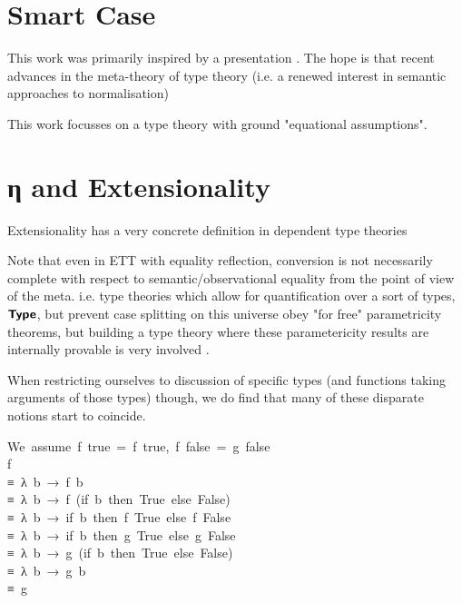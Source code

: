 \documentclass[
    a4paper, %
    fontsize=9.5pt, %
    twoside=false, %
	numbers=noenddot, %
	fontmethod=tex, %
]{kaobook}
\def\resethooks{%
  \global\let\SaveRestoreHook\empty
  \global\let\ColumnHook\empty}
\newlength{\blanklineskip}
\let\hspre\empty
\let\hspost\empty
\newcommand\Keyword[1]{\textsf{\textbf{#1}}}
\begin{document}
\section{Smart Case}

This work was primarily inspired by a presentation 
. The hope is that 
recent advances in the meta-theory of type theory (i.e. a renewed interest in 
semantic approaches to normalisation)

This work focusses on a type theory with ground "equational assumptions".

\section{η and Extensionality}

Extensionality has a very concrete definition in dependent type theories


Note that even in ETT with equality reflection, conversion is not necessarily
complete with respect to semantic/observational equality from the point of view
of the meta. i.e. type theories which allow for
quantification over a sort of types, \ensuremath{\Keyword{Type}}, but prevent case splitting
on this universe obey "for free" parametricity theorems, but building a type
theory where these parametericity results are internally provable is very 
involved .

When restricting ourselves to discussion of specific types (and functions taking
arguments of those types) though, we do find that many of these disparate
notions start to coincide.

\begin{hscode}\SaveRestoreHook
\column{B}{@{}>{\hspre}l<{\hspost}@{}}%
\column{E}{@{}>{\hspre}l<{\hspost}@{}}%
\>[B]{}\mbox{\onelinecomment  We assume f true = f true, f false = g false}{}\<[E]%
\\[\blanklineskip]%
\>[B]{}\mbox{\onelinecomment  f}{}\<[E]%
\\
\>[B]{}\mbox{\onelinecomment  ≡ λ b → f b}{}\<[E]%
\\
\>[B]{}\mbox{\onelinecomment  ≡ λ b → f (if b then True else False)}{}\<[E]%
\\
\>[B]{}\mbox{\onelinecomment  ≡ λ b → if b then f True else f False}{}\<[E]%
\\
\>[B]{}\mbox{\onelinecomment  ≡ λ b → if b then g True else g False}{}\<[E]%
\\
\>[B]{}\mbox{\onelinecomment  ≡ λ b → g (if b then True else False)}{}\<[E]%
\\
\>[B]{}\mbox{\onelinecomment  ≡ λ b → g b}{}\<[E]%
\\
\>[B]{}\mbox{\onelinecomment  ≡ g}{}\<[E]%
\ColumnHook
\end{hscode}\resethooks
\end{document}
